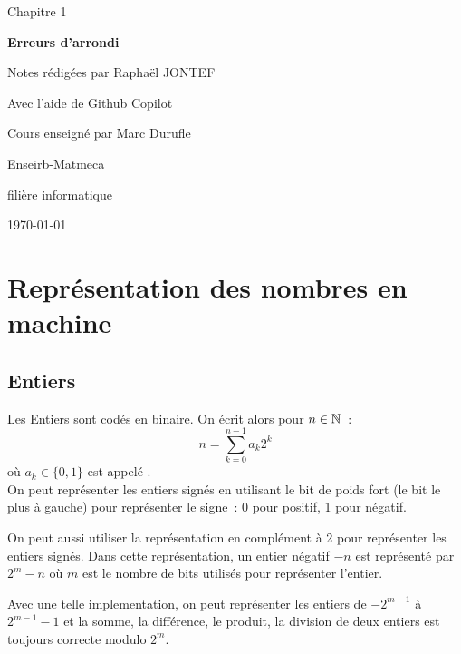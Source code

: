
\newcommand{\titrechapitre}{Erreurs d'arrondi}
\newcommand{\numerochapitre}{1}

\renewcommand{\headrulewidth}{0.4pt}
\renewcommand{\footrulewidth}{0.4pt}
\fancyfoot[C]{\thepage}
\fancyhead[R]{\titrechapitre}
        \usepackage{hhline}




\setlength{\headheight}{15pt}
\begin{titlepage}
    \centering
    \vspace*{3cm}
    {\huge Chapitre \numerochapitre\par}
    {\Huge \bfseries\titrechapitre\par}
    \vspace{2cm}
    {\Large Notes rédigées par Raphaël JONTEF\par}
{\Large Avec l'aide de Github Copilot\par}
    \vspace{0.5cm}
    {\normalsize Cours enseigné par Marc Durufle\par}
    \vspace{4cm}
    {\small Enseirb-Matmeca\par}
    {\small filière informatique\par}
    \vfill
    {\large \today\par}
\end{titlepage}

\tableofcontents
\newpage



\section{Représentation des nombres en machine}
\subsection{Entiers}
Les Entiers sont codés en binaire. On écrit alors pour $n \in \mathbb{N}$~:
$$n = \sum_{k=0}^{n-1}a_k 2^k$$
où $a_k \in \{0,1\}$ est appelé .\\
On peut représenter les entiers signés en utilisant le bit de poids fort (le bit le plus à gauche) pour représenter le signe~: 0 pour positif, 1 pour négatif.\\\par
On peut aussi utiliser la représentation en complément à 2 pour représenter les entiers signés. Dans cette représentation, un entier négatif $-n$ est représenté par $2^m - n$ où $m$ est le nombre de bits utilisés pour représenter l'entier.\\\par
Avec une telle implementation, on peut représenter les entiers de $-2^{m-1}$ à $2^{m-1}-1$ et la somme, la différence, le produit, la division de deux entiers est toujours correcte modulo $2^m$.

